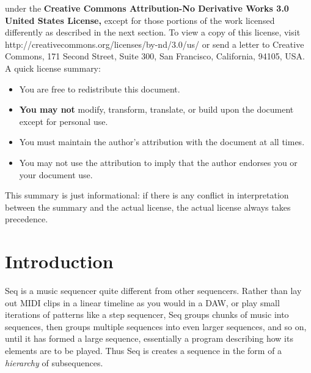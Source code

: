 \documentclass[twoside,10pt]{article}
\begin{document}
\vspace{0.15in}
	 under the {\bf Creative Commons Attribution-No Derivative Works 3.0 United States License,} except for those portions of the work licensed differently as described in the next section. To view a copy of this license, visit http:/\!/creativecommons.org/licenses/by-nd/3.0/us/ or send a letter to Creative Commons, 171 Second Street, Suite 300, San Francisco, California, 94105, USA.  A quick license summary:
	\begin{itemize}
	\item You are free to redistribute this document.
	\vspace{-0.5em}\item {\bf You may not} modify, transform, translate, or build upon the document except for personal use.   
	\vspace{-0.5em}\item You must maintain the author's attribution with the document at all times.
	\vspace{-0.5em}\item You may not use the attribution to imply that the author endorses you or your document use.  
	\end{itemize}
	This summary is just informational: if there is any conflict in interpretation between the summary and the actual license, the actual license always takes precedence.





\normalsize
\cleardoublepage

\tableofcontents
\clearpage


\clearpage\section{Introduction}

Seq is a music sequencer quite different from other sequencers.  Rather than lay out MIDI clips in a linear timeline as you would in a DAW, or play small iterations of patterns like a step sequencer, Seq groups chunks of music into sequences, then groups multiple sequences into even larger sequences, and so on, until it has formed a large sequence, essentially a program describing how its elements are to be played.  Thus Seq is creates a sequence in the form of a {\it hierarchy} of subsequences.
\end{document}
